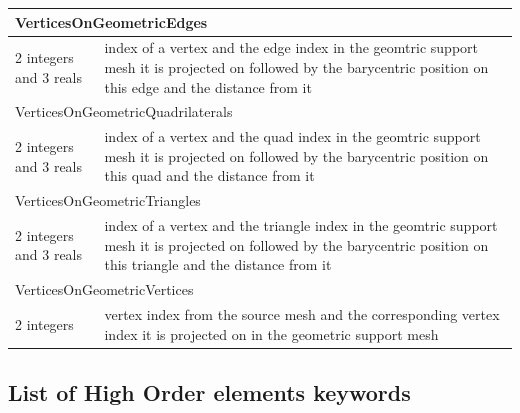 \documentclass[a4paper,12pt]{article}
\begin{document}
\begin{longtable}{|m{4cm}|m{11cm}|}
\multicolumn{2}{|l|}{VerticesOnGeometricEdges} \\
\hline
2 integers and 3 reals & index of a vertex and the edge index in the geomtric support mesh it is projected on followed by the barycentric position on this edge and the distance from it \\
\hline\hline

\multicolumn{2}{|l|}{VerticesOnGeometricQuadrilaterals} \\
\hline
2 integers and 3 reals & index of a vertex and the quad index in the geomtric support mesh it is projected on followed by the barycentric position on this quad and the distance from it \\
\hline\hline

\multicolumn{2}{|l|}{VerticesOnGeometricTriangles} \\
\hline
2 integers and 3 reals & index of a vertex and the triangle index in the geomtric support mesh it is projected on followed by the barycentric position on this triangle and the distance from it \\
\hline\hline

\multicolumn{2}{|l|}{VerticesOnGeometricVertices} \\
\hline
2 integers & vertex index from the source mesh and the corresponding vertex index it is projected on in the geometric support mesh \\
\hline\hline

\end{longtable}



\subsection{List of High Order elements keywords}
\end{document}

